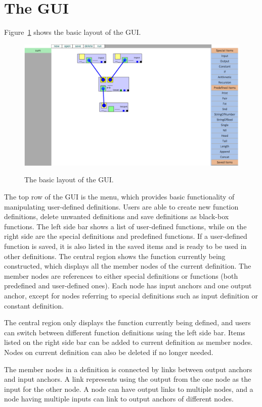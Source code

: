 \documentclass[12pt,UTF8,a4]{article}
\begin{document}
\section{The GUI}
Figure~\ref{fig:gui} shows the basic layout of the GUI.
\begin{figure}[!ht]
\center
\includegraphics[width=.95\textwidth]{./images/gui.png} \\
\caption{The basic layout of the GUI.}\label{fig:gui}
\end{figure}
The top row of the GUI is the menu, which provides basic functionality
of manipulating user-defined definitions. Users are able to create new
function definitions, delete
unwanted definitions and save definitions as black-box functions. The
left side bar shows a list of user-defined functions, while on the
right side are the special definitions and predefined functions. If a
user-defined function is saved, it is also listed in the saved items
and is ready to be used in other definitions. The central region
shows the function currently being constructed, which displays all the
member nodes of the current definition. The member nodes are references to
either special definitions or functions (both predefined and
user-defined ones). Each node has input anchors and one output anchor,
except for nodes referring to special definitions such as input
definition or constant definition.

The central region only displays the function currently being defined,
and users can switch between different function definitions using the
left side bar. Items listed on the right side bar can be added to
current definition as member nodes. Nodes on current definition can
also be deleted if no longer needed.

The member nodes in a definition is connected by links between output
anchors and input anchors. A link represents using the output from the
one node as the input for the other node. A node can have output links
to multiple nodes, and a node having multiple inputs can link to
output anchors of different nodes.
\end{document}
